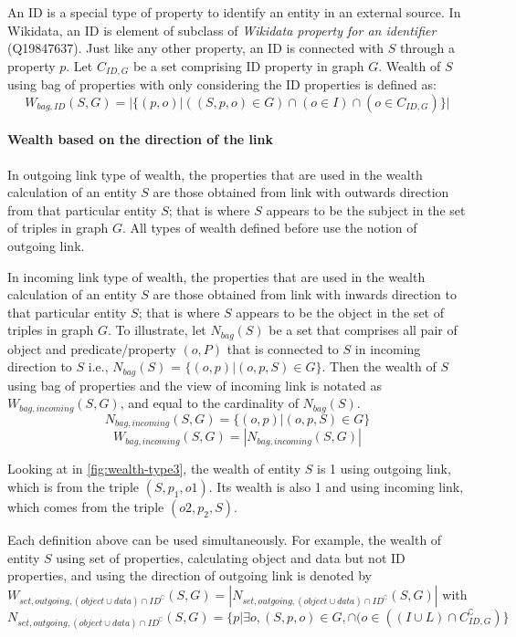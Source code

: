 \documentclass[
]{ceurart}
\begin{document}
An ID is a special type of property to identify an entity in an external source. In Wikidata, an ID is element of subclass of \textit{Wikidata property for an identifier} (Q19847637). Just like any other property, an ID is connected with \(S\) through a property \(p\). Let  \(C_{ID,G}\) be a set comprising ID property in graph \(G\). Wealth of \(S\) using bag of properties with only considering the ID properties is defined as:
\[
    W_{bag, ID}(S, G) = |\{(p,o) | ((S, p, o) \in G) \cap (o \in I) \cap (o \in C_{ID,G})\}|
\]

\paragraph{Wealth based on the direction of the link}
In outgoing link type of wealth, the properties that are used in the wealth calculation of an entity \(S\) are those obtained from link with outwards direction from that particular entity \(S\); that is where \(S\) appears to be the subject in the set of triples in graph \(G\). All types of wealth defined before use the notion of outgoing link.

In incoming link type of wealth, the properties that are used in the wealth calculation of an entity \(S\) are those obtained from link with inwards direction to that particular entity \(S\); that is where \(S\) appears to be the object in the set of triples in graph \(G\). To illustrate, let \(N_{bag}(S)\) be a set that comprises all pair of object and predicate/property \((o,P)\) that is connected to \(S\) in incoming direction to \(S\) i.e., \(N_{bag}(S)\) = \(\{(o, p) | (o, p, S) \in G\}\). Then the wealth of \(S\) using bag of properties and the view of incoming link is notated as \(W_{bag, incoming}(S, G)\), and equal to the cardinality of \(N_{bag}(S)\).
\[
    N_{bag, incoming}(S, G) = \{(o,p) | (o, p, S) \in G\}
\]
\[
    W_{bag, incoming}(S, G) = |N_{bag, incoming}(S, G)|
\]

Looking at in \autoref{fig:wealth-type3}, the wealth of entity \(S\) is 1 using outgoing link, which is from the triple \((S, p_1, o1)\). Its wealth is also 1 and using incoming link, which comes from the triple \((o2, p_2, S)\).

Each definition above can be used simultaneously. For example, the wealth of entity \(S\) using set of properties, calculating object and data but not ID properties, and using the direction of outgoing link is denoted by \(W_{set, outgoing, (object \cup data) \cap ID^\complement}(S, G) = |N_{set, outgoing, (object \cup data) \cap ID^\complement}(S, G)|\) with \(N_{set, outgoing, (object \cup data) \cap ID^\complement}(S, G) = \{p | \exists o, (S, p, o) \in G, \cap (o \in ((I \cup L) \cap C_{ID,G}^\complement)\}\)
\end{document}
